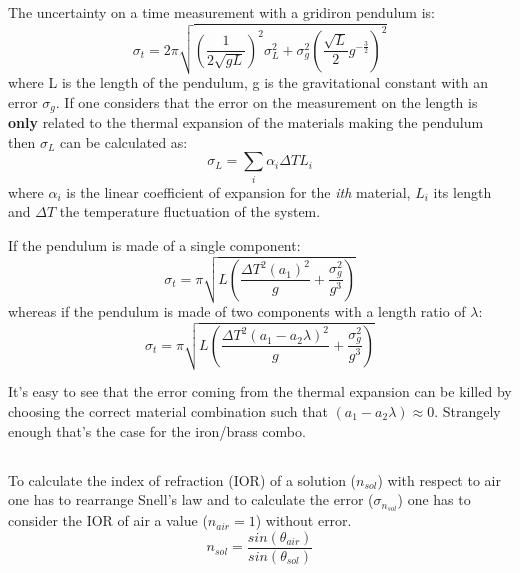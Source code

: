 \documentclass[twocolumn]{article}
\begin{document}
\subsection{} %
\label{sub:gridiron}
	The uncertainty on a time measurement with a gridiron pendulum is:
	\begin{equation}
		\sigma_t  = 2 \pi \sqrt{ (\frac{1}{2 \sqrt{g L }} ) ^{2} \sigma_L ^2 +
		\sigma_g ^2 (\frac{\sqrt{L}}{2} g^{-\frac{3}{2}})^2
		}
	\end{equation}
	where L is the length of the pendulum, g is the gravitational constant with an error $\sigma_g$.
	If one considers that the error on the measurement on the length is \textbf{only} related to the thermal expansion of the materials making the pendulum then $\sigma_L$ can be calculated as:
	\begin{equation}
		\sigma_L = \sum_i \alpha_i  \Delta T  L_i
	\end{equation}
	where $\alpha_i$ is the linear coefficient of expansion for the \emph{ith} material, $L_i$ its length and $\Delta T $ the temperature fluctuation of the system.

	If the pendulum is made of a single component:
	\begin{equation}
	\sigma_t  = \pi \sqrt{L \left(\frac{\Delta T^{2} \left(a_{1} \right)^{2}}{g} + \frac{\sigma_{g}^{2}}{g^{3}}\right)}
	\end{equation}
	whereas if the pendulum is made of two components with a length ratio of $\lambda$:
	\begin{equation}
	\sigma_t  = \pi \sqrt{L \left(\frac{ \Delta  T^{2} \left(a_{1} - a_{2} \lambda \right)^{2}}{g} + \frac{\sigma_{g}^{2}}{g^{3}}\right)}
	\end{equation}

	It's easy to see that the error coming from the thermal expansion can be killed by choosing the correct material combination such that $ \left(a_{1} - a_{2} \lambda\right) \approx 0 $. Strangely enough that's the case for the iron/brass combo.
\subsection{} %
\label{sub:snell}
	To calculate the index of refraction (IOR) of a solution ($n_{sol}$) with respect to air one has to rearrange Snell's law and to calculate the error ($\sigma_{n_{sol}}$) one has to consider the IOR of air a value ($n_{air} =1 $) without error.
	\begin{equation}
	n_{sol} = \frac{ sin(\theta_{air})}{sin(\theta_{sol})} 
	\end{equation}
\end{document}
